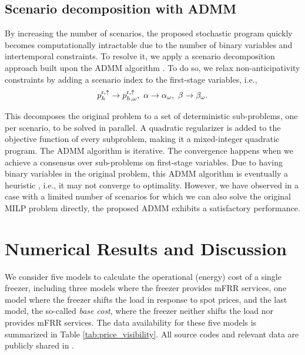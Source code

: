 \documentclass[11pt,a4paper]{article}
\begin{document}
\subsection{Scenario decomposition with ADMM}
By increasing the number of scenarios,  the proposed stochastic program  quickly becomes computationally intractable due to the number of binary variables and intertemporal constraints. To resolve it, we apply a scenario decomposition approach built upon the ADMM algorithm \cite{boyd2011distributed}. To do so, we relax non-anticipativity constraints by adding a scenario index to the first-stage variables, i.e.,
%
\begin{equation}\label{eq:non_anticipativity}
    p_{h}^{\rm{r},\uparrow} \rightarrow p^{\rm{r},\uparrow}_{h,\omega}, \ \alpha \rightarrow \alpha_{\omega}, \ \beta \rightarrow \beta_{\omega}.
\end{equation}

This decomposes the original problem to a set of deterministic sub-problems, one per scenario, to be solved in parallel. A quadratic regularizer is added to the objective function of every subproblem, making it a mixed-integer quadratic program.
The ADMM algorithm is iterative. The convergence happens when we achieve a consensus over sub-problems on first-stage  variables. Due to having binary variables in the original problem, this ADMM algorithm is eventually a heuristic \cite{hong2016convergence}, i.e., it may not converge to optimality. However, we have observed in a case with a limited number of scenarios for which we can also solve the original MILP problem directly, the proposed ADMM exhibits a satisfactory performance.


\section{Numerical Results and Discussion}\label{sec:results}

We consider five models to calculate the operational (energy) cost of a single freezer, including three models where the freezer provides mFRR services, one model where the freezer shifts the load in response to spot prices, and the last model, the so-called \textit{base cost}, where the freezer neither shifts the load nor provides mFRR services. The data availability for these five models is summarized in
Table \ref{tab:price_visibility}. All source codes and relevant data are publicly shared in \cite{code}.
\end{document}
